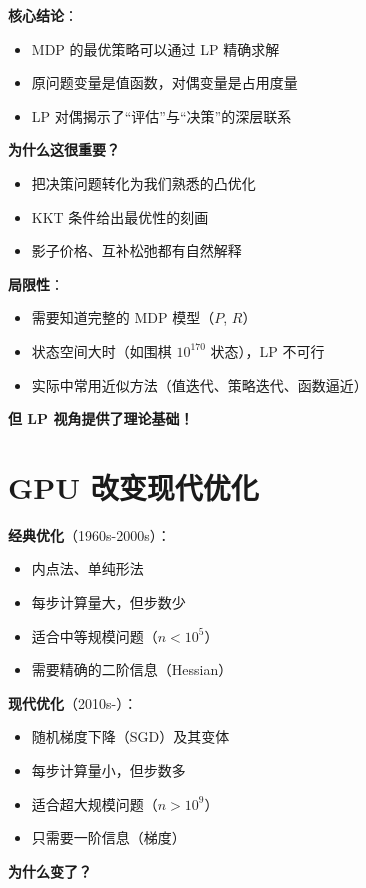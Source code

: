 \documentclass[12pt, a4paper]{ctexart}
\begin{document}
\begin{insight}[MDP-LP 总结]

\textbf{核心结论}：
\begin{itemize}
    \item MDP 的最优策略可以通过 LP 精确求解
    \item 原问题变量是值函数，对偶变量是占用度量
    \item LP 对偶揭示了``评估''与``决策''的深层联系
\end{itemize}

\textbf{为什么这很重要？}
\begin{itemize}
    \item 把决策问题转化为我们熟悉的凸优化
    \item KKT 条件给出最优性的刻画
    \item 影子价格、互补松弛都有自然解释
\end{itemize}

\textbf{局限性}：
\begin{itemize}
    \item 需要知道完整的 MDP 模型（$P$, $R$）
    \item 状态空间大时（如围棋 $10^{170}$ 状态），LP 不可行
    \item 实际中常用近似方法（值迭代、策略迭代、函数逼近）
\end{itemize}

\textbf{但 LP 视角提供了理论基础！}

\end{insight}

\section{GPU 改变现代优化}

\begin{blackboard}

\textbf{经典优化}（1960s-2000s）：

\begin{itemize}
    \item 内点法、单纯形法
    \item 每步计算量大，但步数少
    \item 适合中等规模问题（$n < 10^5$）
    \item 需要精确的二阶信息（Hessian）
\end{itemize}

\textbf{现代优化}（2010s-）：

\begin{itemize}
    \item 随机梯度下降（SGD）及其变体
    \item 每步计算量小，但步数多
    \item 适合超大规模问题（$n > 10^9$）
    \item 只需要一阶信息（梯度）
\end{itemize}

\textbf{为什么变了？}

\end{blackboard}
\end{document}
